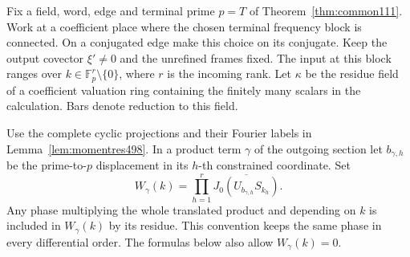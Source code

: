 \documentclass[a4paper,11pt]{article}
\theoremstyle{definition}
\theoremstyle{remark}
\numberwithin{equation}{section}
\begin{document}
Fix a field, word, edge and terminal prime \(p=T\) of
Theorem~\ref{thm:common111}. Work at a coefficient place where
the chosen terminal frequency block is connected. On a conjugated
edge make this choice on its conjugate. Keep the output covector
\(\xi'\ne0\) and the unrefined frames fixed. The input at this
block ranges over \(k\in\mathbb F_p^r\setminus\{0\}\), where
\(r\) is the incoming rank. Let \(\kappa\) be the residue field of a
coefficient valuation ring containing the finitely many scalars in
the calculation. Bars denote reduction to this field.

Use the complete cyclic projections and their Fourier labels in
Lemma~\ref{lem:momentres498}. In a product term \(\gamma\) of the
outgoing section let \(b_{\gamma,h}\) be the prime-to-\(p\)
displacement in its \(h\)-th constrained coordinate. Set
\[
 W_\gamma(k)=\prod_{h=1}^{r}
                  \overline{J_0(U_{b_{\gamma,h}}S_{k_h})}.
\]
Any phase multiplying the whole translated product and depending
on \(k\) is included in \(W_\gamma(k)\) by its residue. This
convention keeps the same phase in every differential order.
The formulas below also allow \(W_\gamma(k)=0\).
\end{document}

